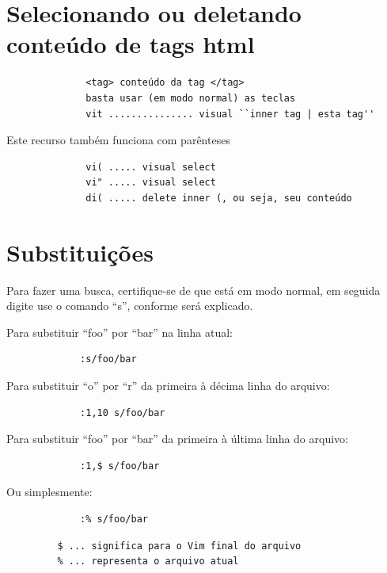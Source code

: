 \documentclass[10pt,a4paper,openany]{book}
\begin{document}
\section{Selecionando ou deletando conteúdo de tags html}
\label{Selecionando ou deletando conteúdo de tags html}

\begin{verbatim}
			  <tag> conteúdo da tag </tag>
			  basta usar (em modo normal) as teclas
			  vit ............... visual ``inner tag | esta tag''
\end{verbatim}

Este recurso também funciona com parênteses

\begin{verbatim}
			  vi( ..... visual select
			  vi" ..... visual select
			  di( ..... delete inner (, ou seja, seu conteúdo
\end{verbatim}


\section{Substituições }
\label{Substituições }

Para fazer uma busca, certifique-se de que está em modo normal, em
seguida digite use o comando ``s'', conforme será explicado.

Para substituir ``foo'' por ``bar'' na linha atual:

\begin{verbatim}
			 :s/foo/bar
\end{verbatim}

Para substituir ``o'' por ``r'' da primeira à décima linha do arquivo:

\begin{verbatim}
			 :1,10 s/foo/bar
\end{verbatim}

Para substituir ``foo'' por ``bar'' da primeira à última linha do arquivo:

\begin{verbatim}
			 :1,$ s/foo/bar
\end{verbatim}

Ou simplesmente:

\begin{verbatim}
			 :% s/foo/bar
\end{verbatim}

\begin{verbatim}
		 $ ... significa para o Vim final do arquivo
		 % ... representa o arquivo atual
\end{verbatim}
\end{document}
